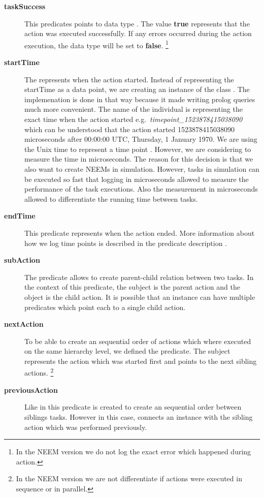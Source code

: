 \begin{description}
	\item[\textbf{taskSuccess}] 
		This predicates points to data type .
		The value \textbf{true} represents that the action was executed successfully.
		If any errors occurred during the action execution, the data type will be set to \textbf{false}.
		\footnote{In the NEEM version \neemversion we do not log the exact error which happened during action.}
	\item[\textbf{startTime}]
		The  represents when the action started.
		Instead of representing the startTime as a data point, we are creating an instance of the class .
		The implemenation is done in that way because it made writing prolog queries much more convenient. 
		The name of the individual is representing the exact time when the action started e.g.\ \textit{timepoint\_1523878415038090} which can be understood that the action started 1523878415038090 microseconds after 00:00:00 UTC, Thursday, 1 January 1970.
		We are using the Unix time to represent a time point \cite{matthew2011beginning}.
		However, we are considering to measure the time in microseconds.
		The reason for this decision is that we also want to create NEEMs in simulation.
		However, tasks in simulation can be executed so fast that logging in microseconds allowed to measure the performance of the task executions.
		Also the measurement in microseconds allowed to differentiate the running time between tasks.
	\item[\textbf{endTime}] 
		This predicate represents when the action ended.
		More information about how we log time points is described in the predicate description .
	\item[\textbf{subAction}]
		The predicate  allows to create parent-child relation between two tasks. In the context of this predicate, the subject is the parent action and the object is the child action.
		It is possible that an  instance can have multiple  predicates which point each to a single child action.
	\item[\textbf{nextAction}]
		To be able to create an sequential order of actions which where executed on the same hierarchy level, we defined the  predicate.
		The subject represents the action which was started first and points to the next sibling actions.
		\footnote{In the NEEM version \neemversion we are not differentiate if actions were executed in sequence or in parallel.}
	\item[\textbf{previousAction}]
		Like in  this predicate is created to create an sequential order between siblings tasks.
		However in this case,  connects an  instance with the sibling action which was performed previously.
\end{description}


